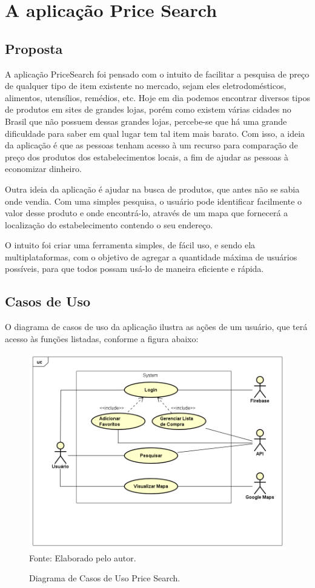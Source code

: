 \section{A aplicação Price Search}

\subsection{Proposta}
A aplicação PriceSearch foi pensado com o intuito de facilitar a pesquisa de preço de qualquer tipo de item existente no mercado, sejam eles eletrodomésticos, alimentos, utensílios, remédios, etc. Hoje em dia podemos encontrar diversos tipos de produtos em sites de grandes lojas, porém como existem várias cidades no Brasil que não possuem dessas grandes lojas, percebe-se que há uma grande dificuldade para saber em qual lugar tem tal item mais barato. Com isso, a ideia da aplicação é que as pessoas tenham acesso à um recurso para comparação de preço dos produtos dos estabelecimentos locais, a fim de ajudar as pessoas à economizar dinheiro. 

Outra ideia da aplicação é ajudar na busca de produtos, que antes não se sabia onde vendia. Com uma simples pesquisa, o usuário pode identificar facilmente o valor desse produto e onde encontrá-lo, através de um mapa que fornecerá a localização do estabelecimento contendo o seu endereço.

O intuito foi criar uma ferramenta simples, de fácil uso, e sendo ela multiplataformas, com o objetivo de agregar a quantidade máxima de usuários possíveis, para que todos possam usá-lo de maneira eficiente e rápida.

\subsection{Casos de Uso}
O diagrama de casos de uso da aplicação ilustra as ações de um usuário, que terá acesso às funções listadas, conforme a figura abaixo:

\begin{figure}[!htb]
\centering
\caption{Diagrama de Casos de Uso Price Search.}
\includegraphics[scale=0.4]{figuras/DiagramaPriceSearchFinal.png}
{\footnotesize Fonte: Elaborado pelo autor.}
\end{figure}

